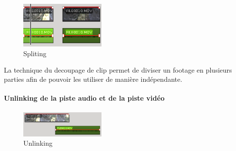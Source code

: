 \begin{figure}

  \vspace{-20pt} \begin{center}

    \includegraphics[width=0.38\textwidth]{images/splited}

  \end{center} \vspace{-20pt} \caption{Spliting} \label{Yes}

  \vspace{-10pt}

\end{figure}

La technique du decoupage de clip permet de diviser un footage en
plusieurs parties afin de pouvoir les utiliser de manière indépendante.

\paragraph{}

\paragraph{Unlinking de la piste audio et de la piste vidéo}

\begin{figure}

  \vspace{-20pt} \begin{center}

  \includegraphics[width=0.38\textwidth]{images/unlinked}

  \end{center} \vspace{-30pt} \caption{Unlinking} \label{Yes}

  \vspace{-10pt}

\end{figure}

